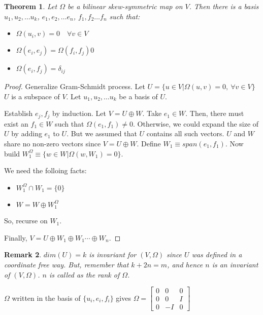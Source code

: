 \documentclass[11pt]{book}
\newtheorem{theorem}{Theorem}
\newtheorem{proof}[theorem]{Proof}
\newtheorem{remark}[theorem]{Remark}
\begin{document}
\begin{theorem}
    Let $\Omega$ be a bilinear skew-symmetric map on $V$. Then there is a basis
    $u_1, u_2, \dots u_k$, $e_1, e_2, \dots e_n$, $f_1, f_2 \dots f_n$ such that:
    \begin{itemize}
        \item $\Omega(u_i, v) = 0 \quad \forall v \in V$
        \item $\Omega(e_i, e_j) =  \Omega(f_i, f_j) 0$
        \item $\Omega(e_i, f_j) = \delta_{ij}$
    \end{itemize}
\end{theorem}
\begin{proof}
    Generalize Gram-Schmidt process.
    Let $U = \{ u \in V | \Omega(u, v) = 0, ~\forall v \in V \}$
    $U$ is a subspace of $V$. Let $u_1, u_2, \dots u_k$ be a basis of $U$.

    Establish $e_j, f_j$ by induction. Let $V = U \oplus W$. Take $e_1 \in W$.
    Then, there must exist an $f_1 \in W$ such that $\Omega(e_1, f_1) \neq 0$. 
    Otherwise, we could expand the size of $U$ by adding $e_1$ to $U$. But
    we assumed that $U$ contains all such vectors. $U$ and $W$ share no non-zero
    vectors since $V = U \oplus W$.  Define $W_1 \equiv span(e_1, f_1)$.  
    Now build $W_1^\Omega \equiv \{ w \in W | \Omega(w, W_1) = 0 \}$.

    We need the folloing facts:
    \begin{itemize}
        \item $W_1^\Omega \cap W_1 = \{ 0 \}$
        \item $W = W \oplus W_1^\Omega$
    \end{itemize}

    So, recurse on $W_1$.

    Finally, $V = U \oplus W_1 \oplus W_1 \cdots \oplus W_n$.
\end{proof}

\begin{remark}
    $dim(U) = k$ is invariant for $(V, \Omega)$ since $U$ was defined in a
    coordinate free way. But, remember that $k + 2n = m$, and hence $n$
    is an invariant of $(V, \Omega)$. $n$ is called as the \emph{rank} of
    $\Omega$.
\end{remark}

$\Omega$ written in the basis of $\{ u_i, e_i, f_i\}$ gives 
$\Omega = \begin{bmatrix} 0 & 0 & 0 \\ 0 & 0 & I \\ 0 & -I & 0 \end{bmatrix}$
\end{document}
